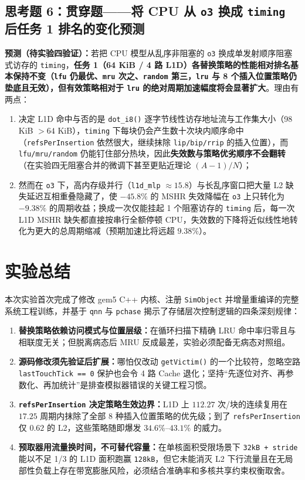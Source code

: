 \documentclass[12pt,a4paper,fontset=mac]{ctexart}
\begin{document}
\subsection*{思考题 6：贯穿题——将 CPU 从 \texttt{o3} 换成 \texttt{timing} 后任务 1 排名的变化预测}
\textbf{预测（待实验四验证）：}若把 CPU 模型从乱序非阻塞的 \texttt{o3} 换成单发射顺序阻塞式访存的 \texttt{timing}，\textbf{任务 1（64 KiB / 4 路 L1D）各替换策略的性能相对排名基本保持不变（\texttt{lfu} 仍最优、\texttt{mru} 次之、\texttt{random} 第三，\texttt{lru} 与 8 个插入位置策略仍垫底且无效），但有效策略相对于 \texttt{lru} 的绝对周期加速幅度将会显著扩大}。理由有两点：
\begin{enumerate}
  \item 决定 L1D 命中与否的是 \texttt{dot\_i8()} 逐字节线性访存地址流与工作集大小（98 KiB $> 64$ KiB），\texttt{timing} 下每块仍会产生数十次块内顺序命中（\texttt{refsPerInsertion} 依然很大，继续抹除 \texttt{lip/bip/rrip} 的插入位置），而 \texttt{lfu/mru/random} 仍能钉住部分热块，因此\textbf{失效数与策略优劣顺序不会翻转}（在实验四无阻塞合并的微调下甚至更贴近理论 $(A-1)/N$）；
  \item 然而在 \texttt{o3} 下，高内存级并行（\texttt{l1d\_mlp} $\approx 15.8$）与长乱序窗口把大量 L2 缺失延迟互相重叠隐藏了，使 $-45.8\%$ 的 MSHR 失效降幅在 \texttt{o3} 上只转化为 $-9.38\%$ 的周期收益；换成一次仅能挂起 1 个阻塞访存的 \texttt{timing} 后，每一次 L1D MSHR 缺失都直接按串行全额停顿 CPU，失效数的下降将近似线性地转化为更大的总周期缩减（预期加速比将远超 $9.38\%$）。
\end{enumerate}

\section{实验总结}
本次实验首次完成了修改 gem5 C++ 内核、注册 \texttt{SimObject} 并增量重编译的完整系统工程训练，并基于 \texttt{qnn} 与 \texttt{pchase} 揭示了存储层次控制逻辑的四条深刻规律：
\begin{enumerate}
  \item \textbf{替换策略依赖访问模式与位置层级：}在循环扫描下精确 LRU 命中率归零且与相联度无关；但脱离病态后 MRU 反成最差，实验必须配备无病态对照组。
  \item \textbf{源码修改须先验证后扩展：}哪怕仅改动 \texttt{getVictim()} 的一个比较符，忽略空路 \texttt{lastTouchTick == 0} 保护也会令 4 路 Cache 退化；坚持“先逐位对齐、再参数化、再加统计”是排查模拟器错误的关键工程习惯。
  \item \textbf{\texttt{refsPerInsertion} 决定策略生效边界：}L1D 上 $112.27$ 次/块的连续复用在 $17.25$ 周期内抹除了全部 8 种插入位置策略的优先级；到了 \texttt{refsPerInsertion} 仅 $0.62$ 的 L2，这些策略随即爆发 $34.6\%$--$43.1\%$ 的威力。
  \item \textbf{预取器用流量换时间，不可替代容量：}在单核面积受限场景下 \texttt{32kB + stride} 能以不足 1/3 的 L1D 面积跑赢 \texttt{128kB}，但它未能消灭 L2 下行流量且在无局部性负载上存在带宽膨胀风险，必须结合准确率和多核共享约束权衡取舍。
\end{enumerate}
\end{document}
